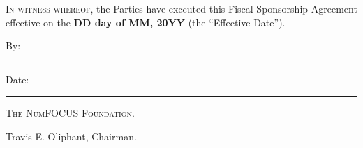 \documentclass[english,letterpaper,12pt]{article}
\newcommand{\agreementdate}{\textbf{DD day of MM, 20YY}}
\begin{document}
\vfill{}


\textsc{In witness whereof}, the Parties have executed this Fiscal
Sponsorship Agreement effective on the \agreementdate{} (the
``Effective Date'').

\vspace{3em}


By: \hspace{0.95em}\rule{0.50\textwidth}{0.2mm} \hfill{}Date: \rule{0.25\textwidth}{0.2mm}

\hspace{2.5em} \textsc{The NumFOCUS Foundation.}

\hspace{2.5em} Travis E. Oliphant, Chairman.  \\[6ex]

\vspace{2ex}


\end{document}
